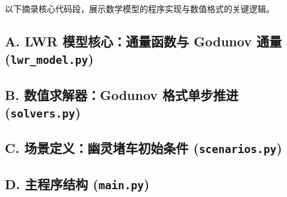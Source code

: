 \documentclass[12pt,a4paper]{ctexart}
\begin{document}
以下摘录核心代码段，展示数学模型的程序实现与数值格式的关键逻辑。

\subsection*{A. LWR 模型核心：通量函数与 Godunov 通量 ({\tt lwr\_model.py})}



\subsection*{B. 数值求解器：Godunov 格式单步推进 ({\tt solvers.py})}



\subsection*{C. 场景定义：幽灵堵车初始条件 ({\tt scenarios.py})}



\subsection*{D. 主程序结构 ({\tt main.py})}



\end{document}
